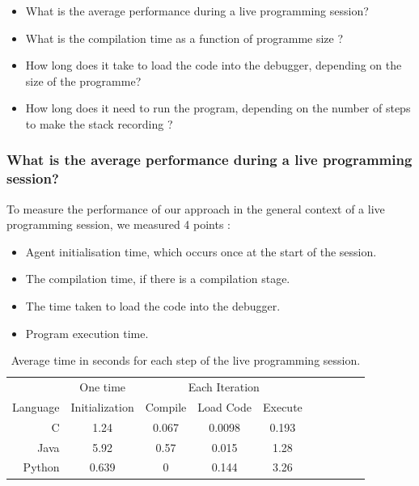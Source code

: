 \documentclass[english,submission]{programming}
\begin{document}
\begin{itemize}
  \item What is the average performance during a live programming session?
  \item What is the compilation time as a function of programme size ?
  \item How long does it take to load the code into the debugger, depending on the size of the programme?
  \item How long does it need to run the program, depending on the number of steps to make the stack recording ?
\end{itemize}

\subsubsection{What is the average performance during a live programming session?}

To measure the performance of our approach in the general context of a live programming session, we measured 4 points : 

\begin{itemize}
  \item Agent initialisation time, which occurs once at the start of the session.
  \item The compilation time, if there is a compilation stage.
  \item The time taken to load the code into the debugger.
  \item Program execution time.
\end{itemize}


\begin{table}[h]
  \centering
  \begin{tabular}{@{} r c c c c c c c c c @{}}
  \toprule
  & \multicolumn{1}{c}{One time} & \multicolumn{3}{c}{Each Iteration} \\
  
  Language & Initialization & Compile & Load Code & Execute \\ \midrule
  C & 1.24 & 0.067 & 0.0098 & 0.193 \\
  Java & 5.92 & 0.57 & 0.015 & 1.28 \\
  Python & 0.639 & 0 & 0.144 & 3.26 \\
  \bottomrule
  \end{tabular}
  \caption{Average time in seconds for each step of the live programming session.}
  \label{table:average-time}
\end{table}
\end{document}
